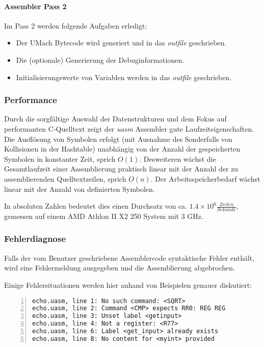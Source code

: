 \paragraph{Assembler Pass 2}

Im Pass 2 werden folgende Aufgaben erledigt:
\begin{itemize}
    \item Der UMach Bytecode wird generiert und in das \emph{outfile}
          geschrieben.
    \item Die (optionale) Generierung der Debuginformationen.
    \item Initialisierungswerte von Variablen werden in das \emph{outfile}
          geschrieben.
\end{itemize}

\subsubsection{Performance}

Durch die sorgfältige Auswahl der Datenstrukturen und dem Fokus auf performanten
C-Quelltext zeigt der \emph{uasm} Assembler gute Laufzeiteigenschaften.
Die Ausflösung von Symbolen erfolgt (mit Ausnahme des Sonderfalls von
Kollisionen in der Hashtable) unabhängig von der Anzahl der gespeicherten
Symbolen in konstanter Zeit, sprich $O(1)$.
Desweiteren wächst die Gesamtlaufzeit einer Assemblierung praktisch linear mit
der Anzahl der zu assemblierenden Quelltextzeilen, sprich $O(n)$.
Der Arbeitsspeicherbedarf wächst linear mit der Anzahl von definierten Symbolen.

In absoluten Zahlen bedeutet dies einen Durchsatz von ca.
$1.4 \times 10^6 \frac{Zeilen}{Sekunde}$, gemessen auf einem
AMD Athlon II X2 250 System mit 3 GHz.

\subsubsection{Fehlerdiagnose}

Falls der vom Benutzer geschriebene Assemblercode syntaktische Fehler enthält,
wird eine Fehlermeldung ausgegeben und die Assemblierung abgebrochen.

Einige Fehlersituationen werden hier anhand von Beispielen genauer diskutiert:
\begin{lstlisting}[numbers=left, numberstyle=\tiny]
echo.uasm, line 1: No such command: <SQRT>
echo.uasm, line 2: Command <CMP> expects RR0: REG REG
echo.uasm, line 3: Unset label <getinput>
echo.uasm, line 4: Not a register: <R77>
echo.uasm, line 6: Label <get_input> already exists
echo.uasm, line 8: No content for <myint> provided
\end{lstlisting}

